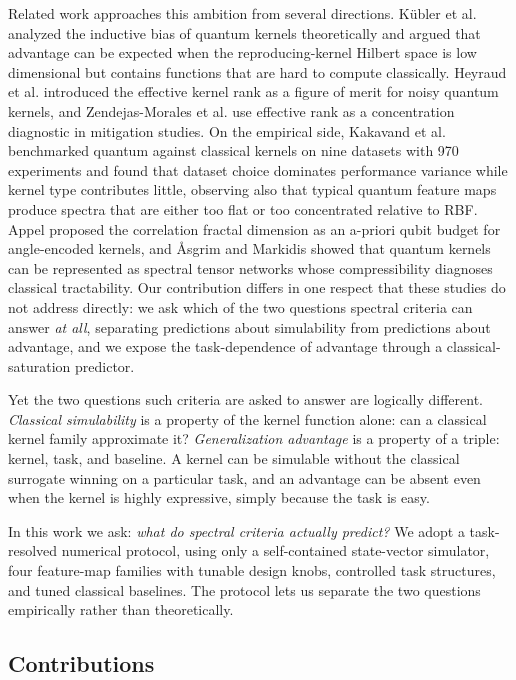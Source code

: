 \documentclass[aps,pra,preprint]{revtex4-2}
\begin{document}
Related work approaches this ambition from several directions. K\"ubler et al.
\cite{kubler2021} analyzed the inductive bias of quantum kernels theoretically and
argued that advantage can be expected when the reproducing-kernel Hilbert space is low
dimensional but contains functions that are hard to compute classically. Heyraud et al.
\cite{heyraud2022} introduced the effective kernel rank as a figure of merit for noisy
quantum kernels, and Zendejas-Morales et al. \cite{zendejas2026} use effective rank as a
concentration diagnostic in mitigation studies. On the empirical side, Kakavand et al.
\cite{kakavand2026} benchmarked quantum against classical kernels on nine datasets with
970 experiments and found that dataset choice dominates performance variance while kernel
type contributes little, observing also that typical quantum feature maps produce spectra
that are either too flat or too concentrated relative to RBF. Appel \cite{appel2026}
proposed the correlation fractal dimension as an a-priori qubit budget for angle-encoded
kernels, and \AA{}sgrim and Markidis \cite{asgrim2026} showed that quantum kernels can be
represented as spectral tensor networks whose compressibility diagnoses classical
tractability. Our contribution differs in one respect that these studies do not address
directly: we ask which of the two questions spectral criteria can answer \emph{at all},
separating predictions about simulability from predictions about advantage, and we expose
the task-dependence of advantage through a classical-saturation predictor.

Yet the two questions such criteria are asked to answer are logically different.
\emph{Classical simulability} is a property of the kernel function alone: can a
classical kernel family approximate it? \emph{Generalization advantage} is a property
of a triple: kernel, task, and baseline. A kernel can be simulable without the
classical surrogate winning on a particular task, and an advantage can be absent even
when the kernel is highly expressive, simply because the task is easy.

In this work we ask: \emph{what do spectral criteria actually predict?} We adopt a
task-resolved numerical protocol, using only a self-contained state-vector simulator,
four feature-map families with tunable design knobs, controlled task structures, and
tuned classical baselines. The protocol lets us separate the two questions empirically
rather than theoretically.

\subsection{Contributions}
\label{sec:contrib}
\end{document}
